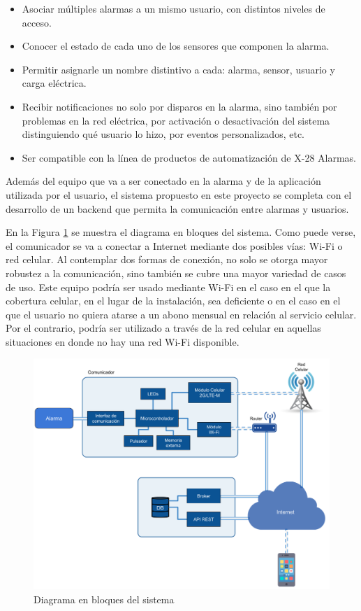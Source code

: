 \documentclass[
11pt, %
codirector, %
]{charter}
\begin{document}
\begin{itemize}
	\item Asociar múltiples alarmas a un mismo usuario, con distintos niveles de acceso.
	\item Conocer el estado de cada uno de los sensores que componen la alarma.
	\item Permitir asignarle un nombre distintivo a cada: alarma, sensor, usuario y carga eléctrica.
	\item Recibir notificaciones no solo por disparos en la alarma, sino también por problemas en la red eléctrica, por activación o desactivación del sistema distinguiendo qué usuario lo hizo, por eventos personalizados, etc.
	\item Ser compatible con la línea de productos de automatización de X-28 Alarmas.
\end{itemize}

Además del equipo que va a ser conectado en la alarma y de la aplicación utilizada por el usuario, el sistema propuesto en este proyecto se completa con el desarrollo de un backend que permita la comunicación entre alarmas y usuarios. 

En la Figura \ref{fig:diagBloques} se muestra el diagrama en bloques del sistema. Como puede verse, el comunicador se va a conectar a Internet mediante dos posibles vías: Wi-Fi o red celular. Al contemplar dos formas de conexión, no solo se otorga mayor robustez a la comunicación, sino también se cubre una mayor variedad de casos de uso. Este equipo podría ser usado mediante Wi-Fi en el caso en el que la cobertura celular, en el lugar de la instalación, sea deficiente o en el caso en el que el usuario no quiera atarse a un abono mensual en relación al servicio celular. Por el contrario, podría ser utilizado a través de la red celular en aquellas situaciones en donde no hay una red Wi-Fi disponible.


\begin{figure}[htpb]
\centering 
\includegraphics[width=\textwidth]{./Figuras/diagBloques.png}
\caption{Diagrama en bloques del sistema}
\label{fig:diagBloques}
\end{figure}
\end{document}
